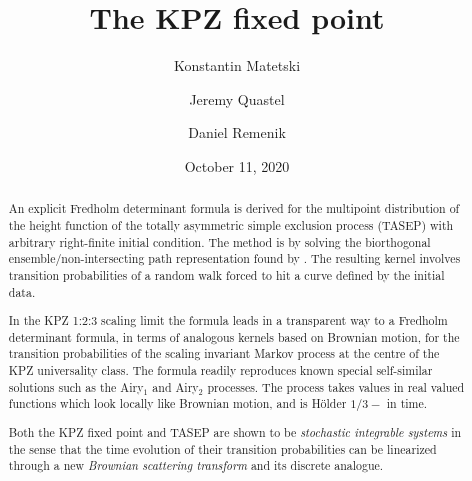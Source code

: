 \documentclass[letterpaper,reqno,11pt,oneside,final]{amsart}
\theoremstyle{definition}
\numberwithin{equation}{section}
\begin{document}

\title{The KPZ fixed point}

\date{October 11, 2020}

\author{Konstantin Matetski} \address[K.~Matetski]{
  Department of Mathematics\\
  University of Toronto\\
  40 St. George Street\\
  Toronto, Ontario\\
  Canada M5S 2E4} 

\author{Jeremy Quastel} \address[J.~Quastel]{
  Department of Mathematics\\
  University of Toronto\\
  40 St. George Street\\
  Toronto, Ontario\\
  Canada M5S 2E4} 

\author{Daniel Remenik} \address[D.~Remenik]{
  Departamento de Ingenier\'ia Matem\'atica and Centro de Modelamiento Matem\'atico (UMI-CNRS 2807)\\
  Universidad de Chile\\
  Av. Beauchef 851, Torre Norte, Piso 5\\
  Santiago\\
  Chile} 

\begin{abstract}  
An explicit Fredholm determinant formula is derived for the multipoint distribution of the height function of the totally asymmetric simple exclusion process (TASEP) with arbitrary right-finite initial condition.
The method is by solving the biorthogonal ensemble/non-intersecting path representation found by \cite{sasamoto,borFerPrahSasam}.
The resulting kernel involves transition probabilities of a random walk forced to hit a curve defined by the initial data. 

In the KPZ 1:2:3 scaling limit the formula leads in a transparent way to a Fredholm determinant formula, in terms of analogous kernels based on Brownian motion, for the transition probabilities of the scaling invariant Markov process at the centre of the KPZ universality class. 
The formula readily reproduces known special self-similar solutions such as the Airy$_1$ and Airy$_2$ processes.
The process takes values in real valued functions which look locally like Brownian motion, and is H\"older $1/3-$ in time.

Both the KPZ fixed point and TASEP are shown to be \emph{stochastic integrable systems} in the sense that the time evolution of their transition probabilities can be linearized through a new \emph{Brownian scattering transform} and its discrete analogue.
\end{abstract}
\end{document}
